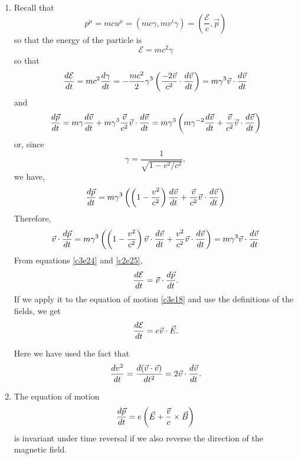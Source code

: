 \begin{enumerate}
\item Recall that 
\begin{equation}\label{c3e22}
p^\mu = mcu^\mu = (mc\gamma, mv^i\gamma) = \left(\frac{\mathcal{E}}{c}, \vec{p}\right)
\end{equation}
so that the energy of the particle is
\begin{equation}\label{c3e23}
\mathcal{E} = mc^2\gamma
\end{equation}
so that
\begin{equation}\label{c3e24}
\frac{d{\mathcal{E}}}{d{t}} = mc^2\frac{d{\gamma}}{d{t}} = 
-\frac{mc^2}{2}\gamma^3\left(\frac{-2\vec{v}}{c^2}\cdot\frac{d{\vec{v}}}{d{t}}\right)
= m\gamma^3 \vec{v}\cdot\frac{d{\vec{v}}}{d{t}}
\end{equation}
and
\[
\frac{d{\vec{p}}}{d{t}} = m\gamma\frac{d{\vec{v}}}{d{t}} + m\gamma^3\frac{\vec{v}}{c^2}\vec{v}\cdot\frac{d{\vec{v}}}{d{t}} = 
m\gamma^3\left(m\gamma^{-2}\frac{d{\vec{v}}}{d{t}} + \frac{\vec{v}}{c^2}\vec{v}\cdot\frac{d{\vec{v}}}{d{t}}\right)
\]
or, since
\[
\gamma = \frac{1}{\sqrt{1 - v^2/c^2}},
\]
we have,
\[
\frac{d{\vec{p}}}{d{t}} = m\gamma^3\left(\left(1 - \frac{v^2}{c^2}\right)\frac{d{\vec{v}}}{d{t}} + 
\frac{\vec{v}}{c^2}\vec{v}\cdot\frac{d{\vec{v}}}{d{t}}\right)
\]
Therefore,
\begin{equation}\label{c3e25}
\vec{v}\cdot\frac{d{\vec{p}}}{d{t}} = m\gamma^3\left(\left(1 - \frac{v^2}{c^2}\right)\vec{v}\cdot\frac{d{\vec{v}}}{d{t}}
+ \frac{v^2}{c^2}\vec{v}\cdot\frac{d{\vec{v}}}{d{t}}\right) = m\gamma^3\vec{v}\cdot\frac{d{\vec{v}}}{d{t}}
\end{equation}
From equations \eqref{c3e24} and \eqref{c2e25},
\begin{equation}\label{c3e26}
\frac{d{\mathcal{E}}}{d{t}} = \vec{v}\cdot\frac{d{\vec{p}}}{d{t}}.
\end{equation}
If we apply it to the equation of motion \eqref{c3e18} and use the definitions 
of the fields, we get
\begin{equation}\label{c3e27}
\frac{d{\mathcal{E}}}{d{t}} = e\vec{v}\cdot\vec{E}.
\end{equation}

Here we have used the fact that
\begin{equation}\label{c3e28}
\frac{d{v^2}}{d{t}} = \frac{d{(\vec{v}\cdot\vec{v})}}{d{t^2}} = 2\vec{v}\cdot\frac{d{\vec{v}}}{d{t}}.
\end{equation}

\item The equation of motion
\begin{equation}\label{c3e29}
\frac{d{\vec{p}}}{d{t}} = e\left(\vec{E} + \frac{\vec{v}}{c}\times\vec{B}\right)
\end{equation}
is invariant under time reversal if we also reverse the direction of the magnetic
field.


\end{enumerate}
